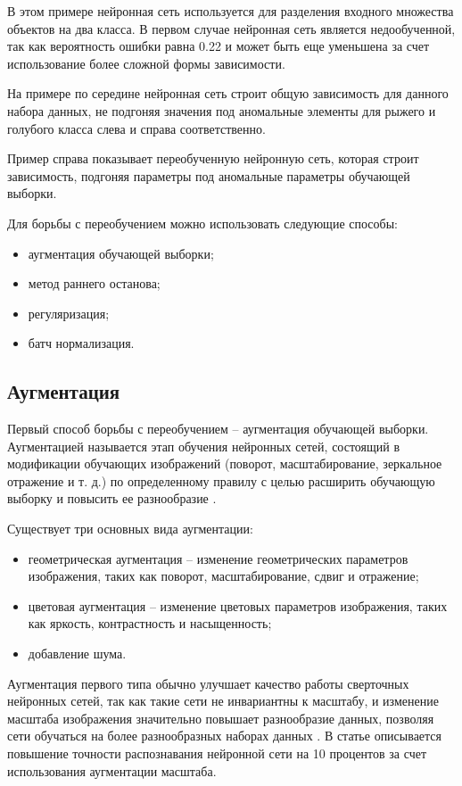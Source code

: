 В этом примере нейронная сеть используется для разделения входного множества объектов на два класса. В первом случае нейронная сеть является недообученной, так как вероятность ошибки равна 0.22 и может быть еще уменьшена за счет использование более сложной формы зависимости.

На примере по середине нейронная сеть строит общую зависимость для данного набора данных, не подгоняя значения под аномальные элементы для рыжего и голубого класса слева и справа соответственно.

Пример справа показывает переобученную нейронную сеть, которая строит зависимость, подгоняя параметры под аномальные параметры обучающей выборки.

Для борьбы с переобучением можно использовать следующие способы:
\begin{itemize}
	\item аугментация обучающей выборки;
	\item метод раннего останова;
	\item регуляризация;
	\item батч нормализация.
\end{itemize}

\subsection{Аугментация}
Первый способ борьбы с переобучением -- аугментация обучающей выборки. Аугментацией называется этап обучения нейронных сетей, состоящий в модификации обучающих изображений (поворот, масштабирование, зеркальное отражение и т. д.) по определенному правилу с целью расширить обучающую выборку и повысить ее разнообразие \cite{augmentation}.

Существует три основных вида аугментации:
\begin{itemize}
	\item геометрическая аугментация -- изменение геометрических параметров изображения, таких как поворот, масштабирование, сдвиг и отражение;
	\item цветовая аугментация -- изменение цветовых параметров изображения, таких как яркость, контрастность и насыщенность;
	\item добавление шума.
\end{itemize}

Аугментация первого типа обычно улучшает качество работы сверточных нейронных сетей, так как такие сети не инвариантны к масштабу, и изменение масштаба изображения значительно повышает разнообразие данных, позволяя сети обучаться на более разнообразных наборах данных \cite{augmentation}. В статье \cite{augmentation1} описывается повышение точности распознавания нейронной сети на 10 процентов за счет использования аугментации масштаба.

